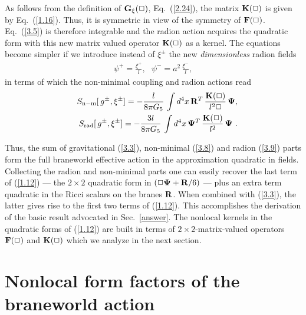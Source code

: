 \documentclass[a4paper,preprint,nofootinbib,
                 showpacs,preprintnumbers,amsmath,amssymb]{revtex4}
\begin{document}
As follows from the definition of ${\bf G}_\xi(\Box)$, 
Eq.~(\ref{2.24}), the matrix ${\bf K}(\Box)$ is given by 
Eq.~(\ref{1.16}). Thus, it is symmetric in view of the symmetry of 
${\bf F}(\Box)$. Eq.~(\ref{3.5}) is therefore integrable 
and the radion action acquires the quadratic form with this new 
matrix valued operator ${\bf K}(\Box)$ as a kernel. The equations 
become simpler if we introduce instead of $\xi^\pm$ the 
new {\em dimensionless} radion fields 
    \begin{eqnarray} 
    \psi^+=\frac{\xi^+}l, \,\,\,\, 
    \psi^-=a^2\,\frac{\xi^-}l,                \label{3.7} 
    \end{eqnarray} 
in terms of which the non-minimal coupling and radion actions read 
    \begin{eqnarray} 
    &&S_{\rm n-m}[\,g^\pm,\xi^\pm]= 
    -\frac l{8\pi G_5}\,\int d^4x\,{\bf R}^T\, 
    \frac{{\bf K}(\Box)}{l^2\Box}\, 
    {\bf\Psi},                           \label{3.8}\\ 
    &&S_{\rm rad}[\,g^\pm,\xi^\pm]= 
    -\frac{3l}{8\pi G_5}\,\int d^4x\, 
    {\bf\Psi}^T\, 
    \frac{{\bf K}(\Box)}{l^2}\, 
    {\bf\Psi}\ .                          \label{3.9} 
    \end{eqnarray} 
 
    Thus, the sum of gravitational (\ref{3.3}), non-minimal (\ref{3.8}) and 
    radion (\ref{3.9}) parts form the full braneworld effective action in the 
    approximation quadratic in fields.  Collecting the radion and non-minimal 
    parts one can easily recover the last term of (\ref{1.12}) --- the 
  $2\times2$ quadratic form in $(\Box{\bf\Psi}+{\bf R}/6)$ --- plus an extra 
    term quadratic in the Ricci scalars on the branes ${\bf R}$. 
When combined with 
    (\ref{3.3}), the latter gives rise to the first two terms of (\ref{1.12}). 
    This accomplishes the derivation of the basic result advocated in 
    Sec.~\ref{answer}. The nonlocal kernels in the quadratic forms of 
    (\ref{1.12}) are built in terms of $2\times2$-matrix-valued operators ${\bf 
      F}(\Box)$ and ${\bf K}(\Box)$ which we analyze in the next section. 
 
\section{Nonlocal form factors of the braneworld action\label{green}} 
 
\end{document}
